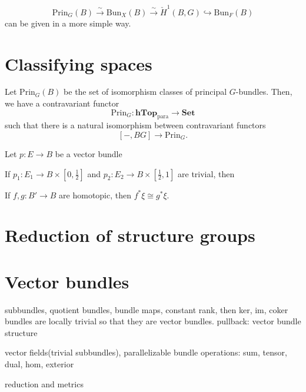 \documentclass{../../large}
\begin{document}
\begin{prb}

\[\mathrm{Prin}_G(B)\xrightarrow{\sim}\mathrm{Bun}_X(B)\xrightarrow{\sim}\check H^1(B,G)\hookrightarrow\mathrm{Bun}_F(B)\]
can be given in a more simple way.

\end{prb}




\section{Classifying spaces}

Let $\mathrm{Prin}_G(B)$ be the set of isomorphism classes of principal $G$-bundles.
Then, we have a contravariant functor
\[\mathrm{Prin}_G:\mathbf{hTop}_{\mathrm{para}}\to\mathbf{Set}\]
such that there is a natural isomorphism between contravariant functors
\[[-,BG]\to\mathrm{Prin}_G.\]


\begin{prb}
Let $p:E\to B$ be a vector bundle

\begin{parts}
\item If $p_1:E_1\to B\times[0,\frac12]$ and $p_2:E_2\to B\times[\frac12,1]$ are trivial, then 
\item If $f,g:B'\to B$ are homotopic, then $f^*\xi\cong g^*\xi$.
\end{parts}
\end{prb}

\begin{prb}

\end{prb}

\section{Reduction of structure groups}

\section{Vector bundles}
subbundles, quotient bundles, bundle maps,
constant rank, then ker, im, coker bundles are locally trivial so that they are vector bundles.
pullback: vector bundle structure

vector fields(trivial subbundles), parallelizable
bundle operations: sum, tensor, dual, hom, exterior

reduction and metrics
\end{document}
